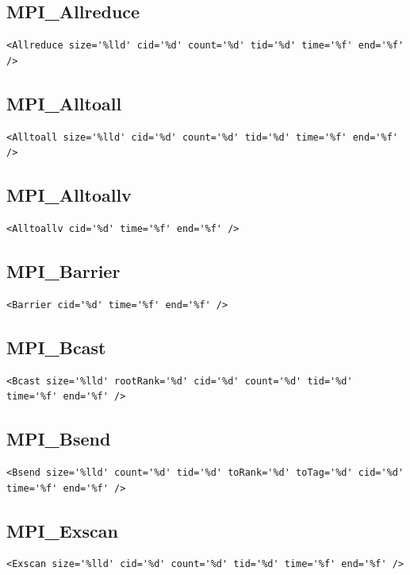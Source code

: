 \documentclass[a4paper,12pt,pdftex]{scrartcl}
\begin{document}
\subsection{MPI\_Allreduce}
\begin{lstlisting}
<Allreduce size='%lld' cid='%d' count='%d' tid='%d' time='%f' end='%f' />
\end{lstlisting}

\subsection{MPI\_Alltoall}
\begin{lstlisting}
<Alltoall size='%lld' cid='%d' count='%d' tid='%d' time='%f' end='%f' />
\end{lstlisting}

\subsection{MPI\_Alltoallv}
\begin{lstlisting}
<Alltoallv cid='%d' time='%f' end='%f' />
\end{lstlisting}

\subsection{MPI\_Barrier}
\begin{lstlisting}
<Barrier cid='%d' time='%f' end='%f' />
\end{lstlisting}

\subsection{MPI\_Bcast}
\begin{lstlisting}
<Bcast size='%lld' rootRank='%d' cid='%d' count='%d' tid='%d' time='%f' end='%f' />
\end{lstlisting}

\subsection{MPI\_Bsend}
\begin{lstlisting}
<Bsend size='%lld' count='%d' tid='%d' toRank='%d' toTag='%d' cid='%d' time='%f' end='%f' />
\end{lstlisting}

\subsection{MPI\_Exscan}
\begin{lstlisting}
<Exscan size='%lld' cid='%d' count='%d' tid='%d' time='%f' end='%f' />
\end{lstlisting}
\end{document}
